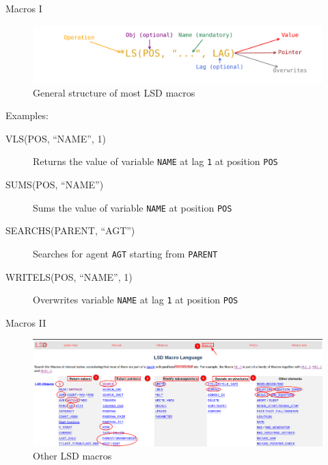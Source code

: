 \documentclass[bigger,aspectratio=169]{beamer}
\begin{document}
\begin{frame}[label={sec:org02e2c9a},fragile]{Macros I}
 \begin{figure}[htbp]
\centering
\includegraphics[width=.9\linewidth]{./figs/Macros_LSD.pdf}
\caption{\label{}General structure of most LSD macros}
\end{figure}

Examples:
\begin{description}
\item[{VLS(POS, ``NAME'', 1)}] Returns the value of variable \texttt{NAME} at lag \texttt{1} at position \texttt{POS}
\item[{SUMS(POS, ``NAME'')}] Sums the value of variable \texttt{NAME} at position \texttt{POS}
\item[{SEARCHS(PARENT, ``AGT'')}] Searches for agent \texttt{AGT} starting from \texttt{PARENT}
\item[{WRITELS(POS, ``NAME'', 1)}] Overwrites variable \texttt{NAME} at lag \texttt{1} at position \texttt{POS}
\end{description}
\end{frame}
\begin{frame}[label={sec:org7f4cffd}]{Macros II}
\begin{figure}[htbp]
\centering
\includegraphics[width=.9\linewidth]{figs/LSD_Macros_ScreenShot.png}
\caption{Other LSD macros}
\end{figure}
\end{frame}
\end{document}
